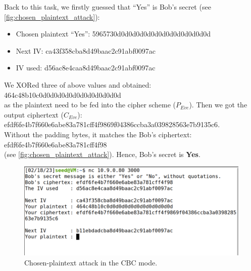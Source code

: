 Back to this task, we firstly guessed that ``Yes'' is Bob's secret (see
\autoref{fig:chosen_plaintext_attack}):

\begin{itemize}
    \item Chosen plaintext ``Yes'': {\selectfont 5965730d0d0d0d0d0d0d0d0d0d0d0d0d}
    \item Next IV: {\selectfont ca43f358cba8d49baac2c91abf0097ac}
    \item IV used: {\selectfont d56ac8e4caa8d49baac2c91abf0097ac}
\end{itemize}

We XORed three of above values and obtained:\\
{\selectfont 464c48b10c0d0d0d0d0d0d0d0d0d0d0d}\\
as the plaintext need to be fed into the cipher scheme (\(P_{Eve}\)).
Then we got the output ciphertext (\(C_{Eve}\)):\\
{\selectfont efdf6fe4b7f660e6abe83a781cff4f9869f04386ccba3a039828563e7b9135c6}.\\
Without the padding bytes, it matches the Bob's ciphertext:\\
{\selectfont efdf6fe4b7f660e6abe83a781cff4f98}\\
(see \autoref{fig:chosen_plaintext_attack}). Hence, Bob's secret is \textbf{Yes}.

\begin{figure}
    \centering
    \includegraphics[height=\textheight,width=\textwidth,keepaspectratio]
    {figures/task6_yes.png}
    \caption{Chosen-plaintext attack in the CBC mode.}\label{fig:chosen_plaintext_attack}
\end{figure}